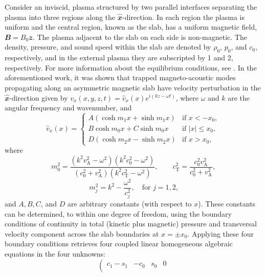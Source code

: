 \documentclass[namedreferences]{solarphysics}
\numberwithin{equation}{section}
\begin{document}
\begin{article}
Consider an inviscid, plasma structured by two parallel interfaces separating the plasma into three regions along the $\mathbfit{\widehat{x}}$-direction. In each region the plasma is uniform and the central region, known as the slab, has a uniform magnetic field, $\mathbfit{B} = B_0 \mathbfit{\widehat{z}}$. The plasma adjacent to the slab on each side is non-magnetic. The density, pressure, and sound speed within the slab are denoted by $\rho_0$, $p_0$, and $c_0$, respectively, and in the external plasma they are subscripted by 1 and 2, respectively. For more information about the equilibrium conditions, see \citealp{all_etal17}. In the aforementioned work, it was shown that trapped magneto-acoustic modes propagating along an asymmetric magnetic slab have velocity perturbation in the $\mathbfit{\widehat{x}}$-direction given by ${v_x(x,y,z,t) = \widehat{v}_x(x)e^{i(kz-\omega t)}}$, where $\omega$ and $k$ are the angular frequency and wavenumber, and
\begin{equation}
\widehat{v}_x(x)=
\begin{cases}
A(\cosh{m_1x}+\sinh{m_1x}) & \text{if }x<-x_0, \\
B\cosh{m_0x}+C\sinh{m_0x} & \text{if }|x|\leq{x_0}, \\
D(\cosh{m_2x}-\sinh{m_2x}) & \text{if  }x>x_0, \label{vsoln}
\end{cases}
\end{equation}
where
\begin{equation}
m_0^2=\frac{(k^2v_\textrm{A}^2-\omega^2)(k^2c_0^2-\omega^2)}{(c_0^2+v_\textrm{A}^2)(k^2c_\textrm{T}^2-\omega^2)}, \qquad c_\textrm{T}^2=\frac{c_0^2v_\textrm{A}^2}{c_0^2+v_\textrm{A}^2}, \label{m0}
\end{equation}
\begin{equation}
m_j^2=k^2-\frac{\omega^2}{c_j^2}, \quad \text{for $j=1,2$,} \label{m1/2}
\end{equation}
and $A, B, C$, and $D$ are arbitrary constants (with respect to $x$). These constants can be determined, to within one degree of freedom, using the boundary conditions of continuity in total (kinetic plus magnetic) pressure and transversal velocity component across the slab boundaries at $x = \pm x_0$. Applying these four boundary conditions retrieves four coupled linear homogeneous algebraic equations in the four unknowns:
\begin{equation}
\left(
\begin{matrix}
c_1-s_1 &-c_0                       &s_0                        &0 \\

\end{matrix}
\end{equation}
\end{article}
\end{document}
